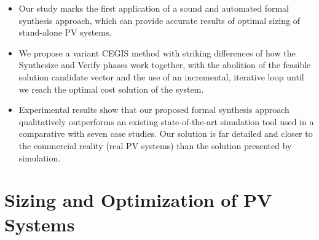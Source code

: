 \documentclass[journal]{IEEEtran}
\begin{document}
\begin{itemize}
\item Our study marks the first application of a sound and automated formal synthesis approach, which can provide accurate results of optimal sizing of stand-alone PV systems. 
\item We propose a variant CEGIS method with striking differences of how the {\sc Synthesize} and {\sc Verify} phases work together, with the abolition of the feasible solution candidate vector and the use of an incremental, iterative loop until we reach the optimal cost solution of the system.
\item Experimental results show that our proposed formal synthesis approach qualitatively outperforms an existing state-of-the-art simulation tool used in a comparative with seven case studies. Our solution is far detailed and closer to the commercial reality (real PV systems) than the solution presented by simulation.
\end{itemize}




\section{Sizing and Optimization of PV Systems}
\label{sec:Background}
\end{document}
